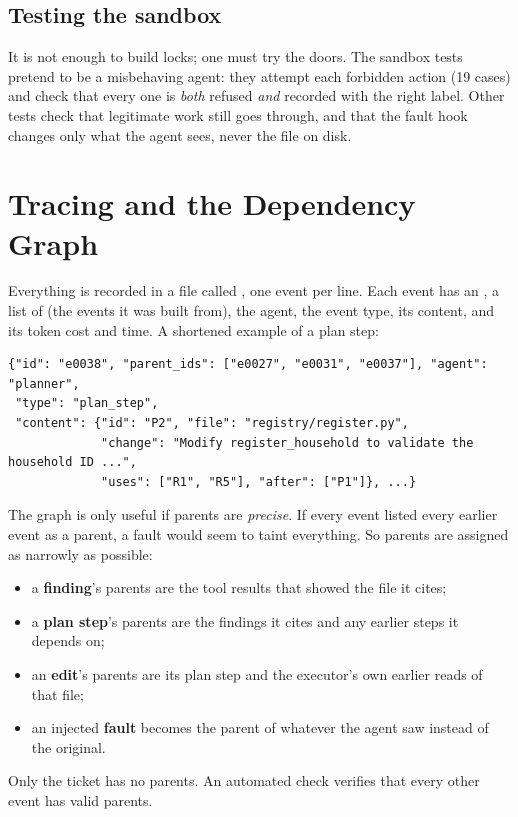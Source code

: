 \documentclass{article}
\newcommand{\code}[1]{\texttt{\detokenize{#1}}}
\begin{document}
\subsection{Testing the sandbox}

It is not enough to build locks; one must try the doors. The sandbox tests pretend to be a misbehaving agent: they attempt each forbidden action (19 cases) and check that every one is \emph{both} refused \emph{and} recorded with the right label. Other tests check that legitimate work still goes through, and that the fault hook changes only what the agent sees, never the file on disk.

\section{Tracing and the Dependency Graph}
\label{sec:trace}

Everything is recorded in a file called \code{trace.jsonl}, one event per line. Each event has an \code{id}, a list of \code{parent_ids} (the events it was built from), the agent, the event type, its content, and its token cost and time. A shortened example of a plan step:

\begin{lstlisting}
{"id": "e0038", "parent_ids": ["e0027", "e0031", "e0037"], "agent": "planner",
 "type": "plan_step",
 "content": {"id": "P2", "file": "registry/register.py",
             "change": "Modify register_household to validate the household ID ...",
             "uses": ["R1", "R5"], "after": ["P1"]}, ...}
\end{lstlisting}

The graph is only useful if parents are \emph{precise}. If every event listed every earlier event as a parent, a fault would seem to taint everything. So parents are assigned as narrowly as possible:
\begin{itemize}
  \item a \textbf{finding}'s parents are the tool results that showed the file it cites;
  \item a \textbf{plan step}'s parents are the findings it cites and any earlier steps it depends on;
  \item an \textbf{edit}'s parents are its plan step and the executor's own earlier reads of that file;
  \item an injected \textbf{fault} becomes the parent of whatever the agent saw instead of the original.
\end{itemize}
Only the ticket has no parents. An automated check verifies that every other event has valid parents.
\end{document}
